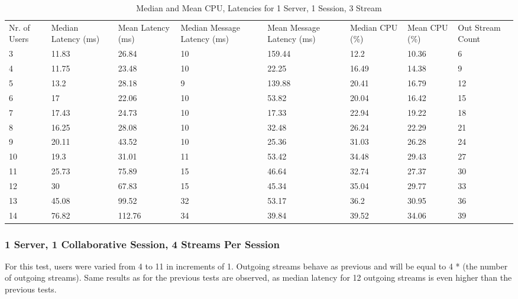 \begin{table}
\caption{Median and Mean CPU, Latencies for 1 Server, 1 Session, 3 Stream}
\label{table:1serv_1sess_3str}
\begin{tabu} to\linewidth{|X[c]|X[c]|X[c]|X[c]|X[c]|X[c]|X[c]|X[c]|}
\everyrow{\hline}
\hline
Nr. of Users & Median Latency (ms) & Mean Latency (ms) & Median Message Latency (ms) & Mean Message Latency (ms) & Median CPU (\%) & Mean CPU (\%) & Out Stream Count\\
3 & 11.83 & 26.84 & 10 & 159.44 & 12.2 & 10.36 & 6 \\
4 & 11.75 & 23.48 & 10 & 22.25 & 16.49 & 14.38 & 9 \\
5 & 13.2 & 28.18 & 9 & 139.88 & 20.41 & 16.79 & 12 \\
6 & 17 & 22.06 & 10 & 53.82 & 20.04 & 16.42 & 15 \\
7 & 17.43 & 24.73 & 10 & 17.33 & 22.94 & 19.22 & 18 \\
8 & 16.25 & 28.08 & 10 & 32.48 & 26.24 & 22.29 & 21 \\
9 & 20.11 & 43.52 & 10 & 25.36 & 31.03 & 26.28 & 24 \\
10 & 19.3 & 31.01 & 11 & 53.42 & 34.48 & 29.43 & 27 \\
11 & 25.73 & 75.89 & 15 & 46.64 & 32.74 & 27.37 & 30 \\
12 & 30 & 67.83 & 15 & 45.34 & 35.04 & 29.77 & 33 \\
13 & 45.08 & 99.52 & 32 & 53.17 & 36.2 & 30.95 & 36 \\
14 & 76.82 & 112.76 & 34 & 39.84 & 39.52 & 34.06 & 39 \\
\end{tabu}
\end{table}

\subsubsection{1 Server, 1 Collaborative Session, 4 Streams Per Session}
\label{sec:1serv_1sess_4str180}

For this test, users were varied from 4 to 11 in increments of 1. Outgoing streams behave as previous and will be equal to 4 * (the number of outgoing streams). Same results as for the previous tests are observed, as median latency for 12 outgoing streams is even higher than the previous tests.

